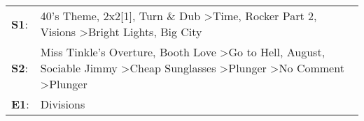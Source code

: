 \begin{supertabular}{p{0.03\textwidth}p{0.92\textwidth}}
 \textbf{S1}:  &                                                                                                                            40's Theme\textsuperscript{}, \enspace 2x2[1]\textsuperscript{}, \enspace Turn \& Dub\textsuperscript{} \textgreater \enspace Time\textsuperscript{}, \enspace Rocker Part 2\textsuperscript{}, \enspace Visions\textsuperscript{} \textgreater \enspace Bright Lights, Big City\textsuperscript{}  \enspace  \\
 \textbf{S2}:  &  Miss Tinkle's Overture\textsuperscript{}, \enspace Booth Love\textsuperscript{} \textgreater \enspace Go to Hell\textsuperscript{}, \enspace August\textsuperscript{}, \enspace Sociable Jimmy\textsuperscript{} \textgreater \enspace Cheap Sunglasses\textsuperscript{} \textgreater \enspace Plunger\textsuperscript{} \textgreater \enspace No Comment\textsuperscript{} \textgreater \enspace Plunger\textsuperscript{}  \enspace  \\
 \textbf{E1}:  &                                                                                                                                                                                                                                                                                                                                                                                                   Divisions\textsuperscript{}  \enspace  \\
\end{supertabular}
